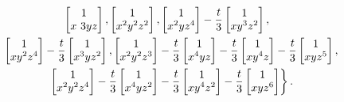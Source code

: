 \documentclass[pdftex]{sigma}%
\numberwithin{equation}{section}
\begin{document}
\begin{Example}
\begin{gather*}
\begin{bmatrix} 1 \\ x~3 y z \end{bmatrix},
\begin{bmatrix} 1 \\ x^{2} y^{2} z^{2}\end{bmatrix},
\begin{bmatrix} 1 \\ x^{2} y z^{4}\end{bmatrix}-\dfrac{t}{3}
\begin{bmatrix} 1 \\ x y^{3} z^{2}\end{bmatrix},
\\
\hphantom{\left\{\right.}
\begin{bmatrix} 1 \\ x y^{2} z^{4}\end{bmatrix} -\dfrac{t}{3}
\begin{bmatrix} 1 \\ x^{3} y z^{2}\end{bmatrix},
\begin{bmatrix} 1 \\ x^{2} y^{2} z^{3}\end{bmatrix} -\dfrac{t}{3}
\begin{bmatrix} 1 \\ x^{4} y z\end{bmatrix} -\dfrac{t}{3}
\begin{bmatrix} 1 \\ x y^{4} z\end{bmatrix} -\dfrac{t}{3}
\begin{bmatrix} 1 \\ x y z^{5}\end{bmatrix},
\\
\hphantom{\left\{\right.}
\left.
\begin{bmatrix} 1 \\ x^{2} y^{2} z^{4}\end{bmatrix} -\dfrac{t}{3}
\begin{bmatrix} 1 \\ x^{4} y z^{2} \end{bmatrix} -\dfrac{t}{3}
\begin{bmatrix} 1 \\ x y^{4} z^{2}\end{bmatrix}-\dfrac{t}{3}
\begin{bmatrix} 1 \\ x y z^{6}\end{bmatrix}\right\}.
\end{gather*}


\end{Example}
\end{document}
